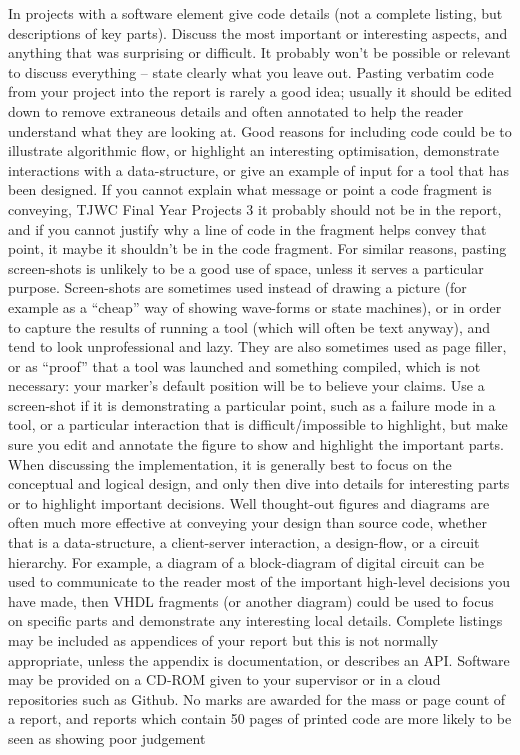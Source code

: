 \documentclass[10pt,onecolumn,letterpaper]{article}
\begin{document}
In projects with a software element give code details
(not a complete listing, but descriptions of key parts).
Discuss the most important or interesting aspects, and
anything that was surprising or difficult. It probably
won't be possible or relevant to discuss everything –
state clearly what you leave out.
Pasting verbatim code from your project into the
report is rarely a good idea; usually it should be edited
down to remove extraneous details and often
annotated to help the reader understand what they
are looking at. Good reasons for including code could
be to illustrate algorithmic flow, or highlight an
interesting optimisation, demonstrate interactions
with a data-structure, or give an example of input for
a tool that has been designed. If you cannot explain
what message or point a code fragment is conveying, 
TJWC Final Year Projects 3
it probably should not be in the report, and if you
cannot justify why a line of code in the fragment helps
convey that point, it maybe it shouldn’t be in the code
fragment.
For similar reasons, pasting screen-shots is unlikely to
be a good use of space, unless it serves a particular
purpose. Screen-shots are sometimes used instead of
drawing a picture (for example as a “cheap” way of
showing wave-forms or state machines), or in order to
capture the results of running a tool (which will often
be text anyway), and tend to look unprofessional and
lazy. They are also sometimes used as page filler, or as
“proof” that a tool was launched and something
compiled, which is not necessary: your marker’s
default position will be to believe your claims. Use a
screen-shot if it is demonstrating a particular point,
such as a failure mode in a tool, or a particular
interaction that is difficult/impossible to highlight, but
make sure you edit and annotate the figure to show
and highlight the important parts.
When discussing the implementation, it is generally
best to focus on the conceptual and logical design,
and only then dive into details for interesting parts or
to highlight important decisions. Well thought-out
figures and diagrams are often much more effective at
conveying your design than source code, whether that
is a data-structure, a client-server interaction, a
design-flow, or a circuit hierarchy. For example, a
diagram of a block-diagram of digital circuit can be
used to communicate to the reader most of the
important high-level decisions you have made, then
VHDL fragments (or another diagram) could be used
to focus on specific parts and demonstrate any
interesting local details.
Complete listings may be included as appendices of
your report but this is not normally appropriate,
unless the appendix is documentation, or describes an
API. Software may be provided on a CD-ROM given to
your supervisor or in a cloud repositories such as
Github. No marks are awarded for the mass or page count of a report, and reports which contain 50 pages
of printed code are more likely to be seen as showing
poor judgement
\end{document}
